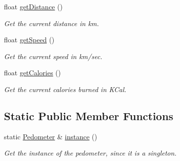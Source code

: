 \begin{DoxyCompactItemize}
float \hyperlink{class_pedometer_a2120dca6727a59a76339ca2273841797}{get\-Distance} ()
\begin{DoxyCompactList}\small\item\em Get the current distance in km. \end{DoxyCompactList}\item 
float \hyperlink{class_pedometer_a2e2ce2a5ddb05410aa7e2c1eb0746da0}{get\-Speed} ()
\begin{DoxyCompactList}\small\item\em Get the current speed in km/sec. \end{DoxyCompactList}\item 
float \hyperlink{class_pedometer_a6470da610c09e3ea71fa1b8a67351da1}{get\-Calories} ()
\begin{DoxyCompactList}\small\item\em Get the current calories burned in K\-Cal. \end{DoxyCompactList}\end{DoxyCompactItemize}
\subsection*{Static Public Member Functions}
\begin{DoxyCompactItemize}
\item 
static \hyperlink{class_pedometer}{Pedometer} \& \hyperlink{class_pedometer_a0c788457ae234fd7dd76f73fa1455036}{instance} ()
\begin{DoxyCompactList}\small\item\em Get the instance of the pedometer, since it is a singleton. \end{DoxyCompactList}\end{DoxyCompactItemize}
